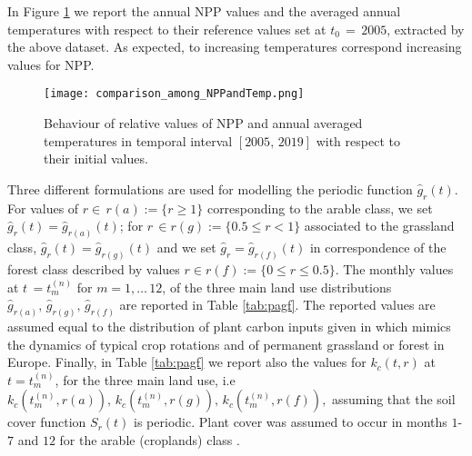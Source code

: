 \noindent In  Figure \ref{fig:nppvstemp} we report the annual NPP values and the averaged annual temperatures  with respect to their reference values set at $t_0\,=\,2005$, extracted by the above dataset.  As expected, to increasing temperatures correspond increasing values for NPP.

\begin{figure}[t] %
\begin{center} 
  \texttt{[image: comparison\_among\_NPPandTemp.png]}
  \caption{Behaviour of relative values of NPP and annual averaged temperatures in temporal interval $[2005,\, 2019]$ with respect to their initial values.  }\label{fig:nppvstemp}  
\end{center}
\end{figure}



\noindent Three different  formulations are used for modelling the periodic function $\hat g_r(t)$. For values of $r \in \, r(a):=\{ r\geq 1 \}$  corresponding to the arable class, we set $\hat g_r(t)= \hat g_{r(a)}(t)$; for  $r\, \in r(g):=\{0.5 \leq r < 1\}$ associated to the grassland class, $\hat g_r(t)= \hat g_{r(g)}(t)$
and we set  $\hat g_r= \hat g_{r(f)}(t)$ in correspondence of the forest class described by values $r \in r(f):=\{ 0 \leq  r \leq 0.5\}$. The monthly values at $t\, = t_{m}^{(n)}$ for $m=1,\dots\,12$,  of the three main land use  distributions $\hat g_{r(a)},\, \hat g_{r(g)}, \,\hat g_{r(f)}$ 
 are reported in Table \ref{tab:pagf}. The reported values are assumed equal to  the distribution  of plant carbon inputs  given in \cite{gottschalk2012will} which  mimics the dynamics of typical crop rotations and of permanent grassland or forest in Europe. Finally,  in Table \ref{tab:pagf} we report also the values for $k_c(t,r)$ at $t=t_{m}^{(n)}$, for the three main land use, i.e $k_c(t_{m}^{(n)},r(a)),\, k_c(t_{m}^{(n)},r(g)), \,k_c(t_{m}^{(n)},r(f)),$  assuming that the soil cover function $S_r(t)$ is periodic.  Plant cover
was assumed to occur 
in months $1$-$7$ and $12$ for the arable (croplands) class  \cite{smith2005projected}. 


